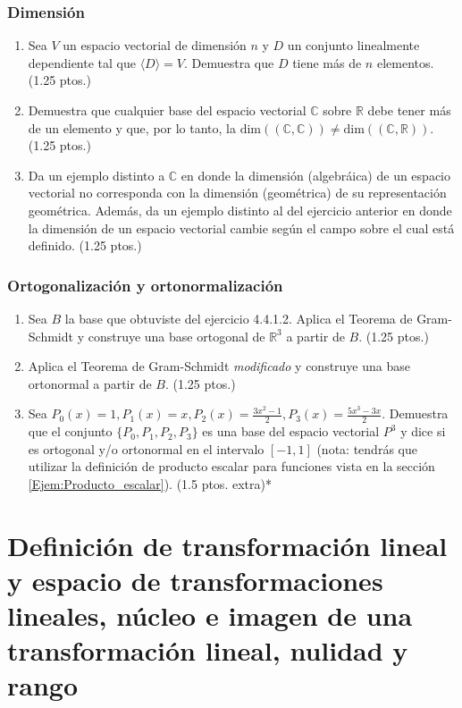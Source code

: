 \documentclass[12pt]{article}
\begin{document}
\subsubsection{Dimensión}
\begin{enumerate}
    \item Sea $V$ un espacio vectorial de dimensión $n$ y $D$ un conjunto linealmente dependiente tal que $\langle D \rangle =V$. Demuestra que $D$ tiene más de $n$ elementos. (1.25 ptos.)
    \item Demuestra que cualquier base del espacio vectorial $\mathbb{C}$ sobre $\mathbb{R}$ debe tener más de un elemento y que, por lo tanto, la $\text{dim}((\mathbb{C},\mathbb{C}))\neq \text{dim}((\mathbb{C},\mathbb{R})).$ (1.25 ptos.)
    \item Da un ejemplo distinto a $\mathbb{C}$ en donde la dimensión (algebráica) de un espacio vectorial no corresponda con la dimensión (geométrica) de su representación geométrica. Además, da un ejemplo distinto al del ejercicio anterior en donde la dimensión de un espacio vectorial cambie según el campo sobre el cual está definido. (1.25 ptos.)
\end{enumerate}


\subsubsection{Ortogonalización y ortonormalización}
\begin{enumerate}
    \item Sea $B$ la base que obtuviste del ejercicio 4.4.1.2. Aplica el Teorema de Gram-Schmidt y construye una base ortogonal de $\mathbb{R}^3$ a partir de $B$. (1.25 ptos.)
    \item Aplica el Teorema de Gram-Schmidt \emph{modificado} y construye una base ortonormal a partir de $B$. (1.25 ptos.)
\item Sea $P_0(x)=1, P_1(x)=x, P_2(x)=\frac{3x^2-1}{2}, P_3(x)=\frac{5x^3-3x}{2}.$ Demuestra que el conjunto $\{P_0,P_1,P_2,P_3\}$ es una base del espacio vectorial $P^3$ y dice si es ortogonal y/o ortonormal en el intervalo $[-1,1]$ (nota: tendrás que utilizar la definición de producto escalar para funciones vista en la sección \ref{Ejem:Producto_escalar}). (1.5 ptos. extra)*
\end{enumerate}

\newpage
\section{Definición de transformación lineal y espacio de transformaciones lineales, núcleo e imagen de una transformación lineal, nulidad y rango}
\end{document}
